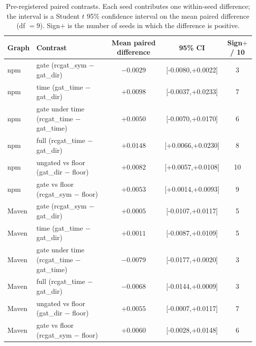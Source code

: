 \begin{table}[t]
\caption{Pre-registered paired contrasts. Each seed contributes one within-seed
difference; the interval is a Student $t$ 95\% confidence interval on the mean paired
difference (df $=9$). Sign$+$ is the number of seeds in which the difference is positive.}
\label{tab:paired}
\begin{tabular}{llccc}
\toprule
Graph & Contrast & Mean paired difference & 95\% CI & Sign$+$ / 10 \\
\midrule
npm & gate (rcgat\_sym $-$ gat\_dir) & $-0.0029$ & [-0.0080,+0.0022] & 3 \\
npm & time (gat\_time $-$ gat\_dir) & $+0.0098$ & [-0.0037,+0.0233] & 7 \\
npm & gate under time (rcgat\_time $-$ gat\_time) & $+0.0050$ & [-0.0070,+0.0170] & 6 \\
npm & full (rcgat\_time $-$ gat\_dir) & $+0.0148$ & [+0.0066,+0.0230] & 8 \\
npm & ungated vs floor (gat\_dir $-$ floor) & $+0.0082$ & [+0.0057,+0.0108] & 10 \\
npm & gate vs floor (rcgat\_sym $-$ floor) & $+0.0053$ & [+0.0014,+0.0093] & 9 \\
\midrule
Maven & gate (rcgat\_sym $-$ gat\_dir) & $+0.0005$ & [-0.0107,+0.0117] & 5 \\
Maven & time (gat\_time $-$ gat\_dir) & $+0.0011$ & [-0.0087,+0.0109] & 5 \\
Maven & gate under time (rcgat\_time $-$ gat\_time) & $-0.0079$ & [-0.0177,+0.0020] & 3 \\
Maven & full (rcgat\_time $-$ gat\_dir) & $-0.0068$ & [-0.0144,+0.0009] & 3 \\
Maven & ungated vs floor (gat\_dir $-$ floor) & $+0.0055$ & [-0.0007,+0.0117] & 7 \\
Maven & gate vs floor (rcgat\_sym $-$ floor) & $+0.0060$ & [-0.0028,+0.0148] & 6 \\
\bottomrule
\end{tabular}
\end{table}
